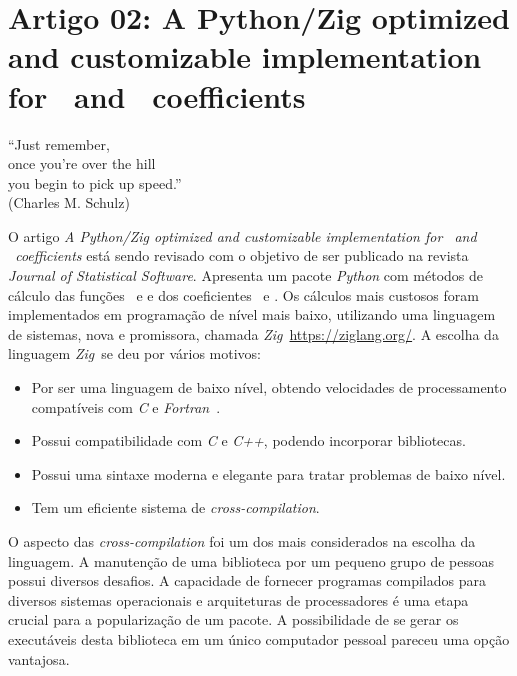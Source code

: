 \chapter{Artigo 02: A Python/Zig optimized and customizable
implementation for \pdcca~and \dmc~coefficients}
\label{cap:paper_02}

\begin{flushright}
    ``Just remember, \\
    once you're over the hill\\
    you begin to pick up speed.''\\[10px]
    (Charles M. Schulz)
    \end{flushright}


O artigo \emph{A Python/Zig optimized and customizable
implementation for \pdcca~and \dmc~coefficients} está sendo revisado com o objetivo de ser publicado na revista \emph{Journal of Statistical Software}. Apresenta um pacote \emph{Python} com métodos de cálculo das funções \dfa~e \dcca e dos coeficientes \pdcca~e \dmc. Os cálculos mais custosos foram implementados em programação de nível mais baixo, utilizando uma linguagem de sistemas, nova e promissora, chamada \emph{Zig}~\url{https://ziglang.org/}. A escolha da linguagem \emph{Zig}~se deu por vários motivos: 

\begin{itemize}
\item Por ser uma linguagem de baixo nível, obtendo velocidades de processamento compatíveis com \emph{C} e \emph{Fortran}~\cite{10820804, Kacs_2024}.
\item Possui compatibilidade com \emph{C} e \emph{C++}, podendo incorporar bibliotecas.
\item Possui uma sintaxe moderna e elegante para tratar problemas de baixo nível.
\item Tem um eficiente sistema de \emph{cross-compilation}.
\end{itemize}

O aspecto das \emph{cross-compilation} foi um dos mais considerados na escolha da linguagem. A manutenção de uma biblioteca por um pequeno grupo de pessoas possui diversos desafios. A capacidade de fornecer programas compilados para diversos sistemas operacionais e arquiteturas de processadores é uma etapa crucial para a popularização de um pacote. A possibilidade de se gerar os executáveis desta biblioteca em um único computador pessoal pareceu uma opção vantajosa.

